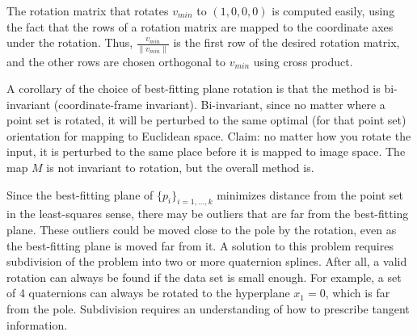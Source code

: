 {The rotation matrix that rotates $v_{min}$
to $(1,0,0,0)$ is computed easily, using the fact that the rows
of a rotation matrix are mapped to the coordinate axes under the
rotation.
Thus, $\frac{v_{min}}{\|v_{min}\|}$ is the first row of the desired rotation matrix,
and the other rows are chosen orthogonal to $v_{min}$ using
cross product.

A corollary of the choice of best-fitting plane rotation
is that the method is bi-invariant (coordinate-frame invariant).
Bi-invariant, since no matter where a point set is rotated,
it will be perturbed to the same optimal (for that point set)
orientation for mapping to Euclidean space.
Claim: no matter how you rotate the input, it is perturbed to the same
place before it is mapped to image space.
The map $M$ is not invariant to rotation, but the overall method is.

Since the best-fitting plane of $\{p_i\}_{i=1,\ldots,k}$ 
minimizes distance from the point set in the least-squares sense,
there may be outliers that are far from the best-fitting plane.
These outliers could be moved close to the pole by the rotation,
even as the best-fitting plane is moved far from it.
A solution to this problem requires subdivision of the problem
into two or more quaternion splines.
After all, a valid rotation can always be found if the data
set is small enough.
For example, a set of 4 quaternions can always be rotated to
the hyperplane $x_1=0$, which is far from the pole.
Subdivision requires an understanding of how to prescribe tangent
information.

} %



